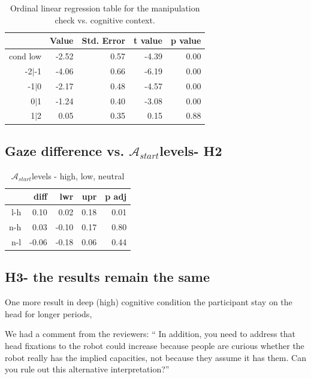 \documentclass[lettersize, noapacite, twoside, HRI]{apa_HRI}
\newcommand{\anti}{{$\mathcal{A}_{start}$\xspace}}
\begin{document}
\begin{table}[ht]
\caption{Ordinal linear regression table for the manipulation check vs. cognitive context.}
\centering
\begin{tabular}{rrrrr}
  \hline
 & Value & Std. Error & t value & p value \\ 
  \hline
cond low & -2.52 & 0.57 & -4.39 & 0.00 \\ 
  -2$|$-1 & -4.06 & 0.66 & -6.19 & 0.00 \\ 
  -1$|$0 & -2.17 & 0.48 & -4.57 & 0.00 \\ 
  0$|$1 & -1.24 & 0.40 & -3.08 & 0.00 \\ 
  1$|$2 & 0.05 & 0.35 & 0.15 & 0.88 \\ 
   \hline
\end{tabular}
\end{table}



\subsection{Gaze difference vs. \anti levels- H2}



\begin{table}[ht]
\caption{\anti levels - high, low, neutral}
\centering
\begin{tabular}{rrrrr}
  \hline
 & diff & lwr & upr & p adj \\ 
  \hline
l-h & 0.10 & 0.02 & 0.18 & 0.01 \\ 
  n-h & 0.03 & -0.10 & 0.17 & 0.80 \\ 
  n-l & -0.06 & -0.18 & 0.06 & 0.44 \\ 
   \hline
\end{tabular}
\end{table}


\subsection{H3- the results remain the same}

One more result in deep (high) cognitive condition the participant stay on the head for longer periods, 

We had a comment from the reviewers: `` In addition, you need to address that
head fixations to the robot could increase because people are curious whether
the robot really has the implied capacities, not because they assume it has
them. Can you rule out this alternative interpretation?'' 
\end{document}

